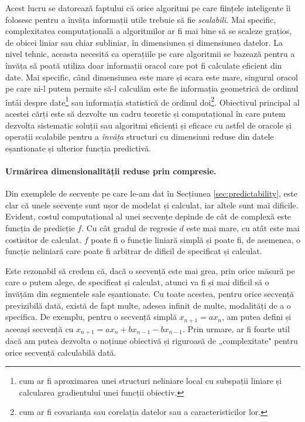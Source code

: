 \documentclass[../../book-main_ro.tex]{subfiles}
\begin{document}
Acest lucru se datorează faptului că orice algoritmi pe care ființele inteligente îi folosesc pentru a învăța informații utile trebuie să fie {\em scalabili}. Mai specific, complexitatea computațională a algoritmilor ar fi mai bine să se scaleze grațios, de obicei liniar sau chiar subliniar, în dimensiunea și dimensiunea datelor. La nivel tehnic, aceasta necesită ca operațiile pe care algoritmii se bazează pentru a învăța să poată utiliza doar informații oracol care pot fi calculate eficient din date. Mai specific, când dimensiunea este mare și scara este mare, singurul oracol pe care ni-l putem permite să-l calculăm este fie informația geometrică de ordinul întâi despre date\footnote{cum ar fi aproximarea unei structuri neliniare local cu subspații liniare și calcularea gradientului unei funcții obiectiv.} sau informația statistică de ordinul doi\footnote{cum ar fi covarianța sau corelația datelor sau a caracteristicilor lor.}.
Obiectivul principal al acestei cărți este să dezvolte un cadru teoretic și computațional în care putem dezvolta sistematic soluții sau algoritmi eficienți și eficace cu astfel de oracole și operații scalabile pentru a {\em învăța} structuri cu dimensiuni reduse din datele eșantionate și ulterior funcția predictivă.


\paragraph{Urmărirea dimensionalității reduse prin compresie.}
Din exemplele de secvențe pe care le-am dat în Secțiunea \ref{sec:predictability}, este clar că unele secvențe sunt ușor de modelat și calculat, iar altele sunt mai dificile. Evident, costul computațional al unei secvențe depinde de cât de complexă este funcția de predicție $f$. Cu cât gradul de regresie $d$ este mai mare, cu atât este mai costisitor de calculat. $f$ poate fi o funcție liniară simplă și poate fi, de asemenea, o funcție neliniară care poate fi arbitrar de dificil de specificat și calculat.

Este rezonabil să credem că, dacă o secvență este mai grea, prin orice măsură pe care o putem alege, de specificat și calculat, atunci va fi și mai dificil să o învățăm din segmentele sale eșantionate. Cu toate acestea, pentru orice secvență previzibilă dată, există de fapt multe, adesea infinit de multe, modalități de a o specifica. De exemplu, pentru o secvență simplă $x_{n+1} = a x_{n}$, am putea defini și aceeași secvență cu $x_{n+1} = a x_n + b x_{n-1} - b x_{n-1}.$
Prin urmare, ar fi foarte util dacă am putea dezvolta o noțiune obiectivă și riguroasă de „complexitate" pentru orice secvență calculabilă dată.
\end{document}
